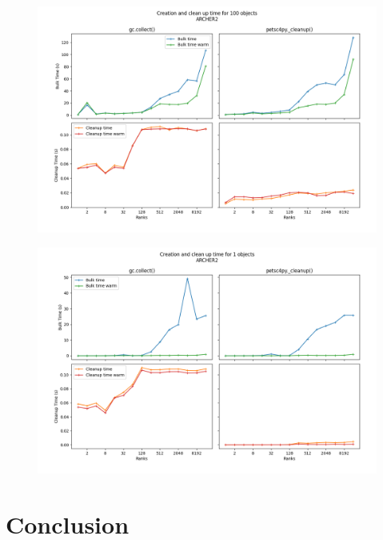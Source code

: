 \documentclass[10pt,journal,compsoc]{IEEEtran}
\begin{document}
\clearpage
\begin{figure}[htb]
	\centering
	\includegraphics[width=\textwidth]{D100BS128B_222.png}
	\vspace{-1em}
	\caption{}
	\label{fig:}
\end{figure}

\clearpage
\begin{figure}[htb]
	\centering
	\includegraphics[width=\textwidth]{D1BS128B_5005.png}
	\vspace{-1em}
	\caption{}
	\label{fig:}
\end{figure}


\section{Conclusion}
\label{sec:conclusion}




\end{document}
